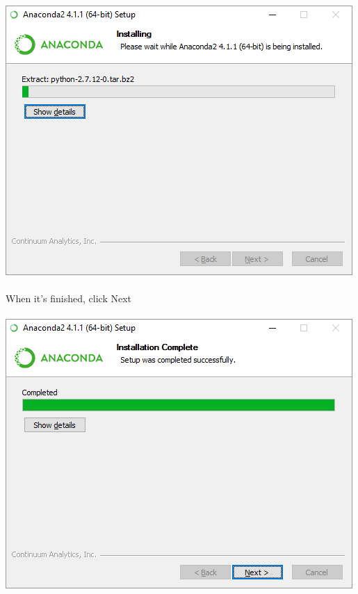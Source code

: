 \documentclass[]{article}
\begin{document}
\paragraph{}
\begin{centering}
    \centerline{\includegraphics[scale=0.7]{Screenshot_10.png}}
\end{centering}

\paragraph{}
When it's finished, click Next
\paragraph{}
\begin{centering}
    \centerline{\includegraphics[scale=0.7]{Screenshot_11.png}}
\end{centering}
\end{document}
